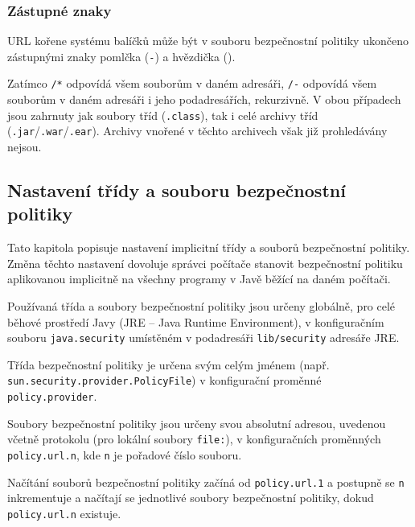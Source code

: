 \subsubsection{Zástupné znaky}

URL kořene systému balíčků může být v souboru bezpečnostní politiky ukončeno zástupnými znaky pomlčka ({\tt -}) a hvězdička ({\tt *}).

Zatímco {\tt /*} odpovídá všem souborům v daném adresáři, {\tt /-} odpovídá všem souborům v daném adresáři i jeho podadresářích, rekurzivně.
V obou případech jsou zahrnuty jak soubory tříd ({\tt .class}), tak i celé archivy tříd ({\tt .jar}/{\tt .war}/{\tt .ear}).
Archivy vnořené v těchto archivech však již prohledávány nejsou.
\cite{jdkdocPolicyFiles}

\subsection{Nastavení třídy a souboru bezpečnostní politiky} \label{nastaveniPolitiky}

Tato kapitola popisuje nastavení implicitní třídy a souborů bezpečnostní politiky. Změna těchto nastavení dovoluje správci počítače
stanovit bezpečnostní politiku aplikovanou implicitně na všechny programy v Javě běžící na daném počítači.

Používaná třída a soubory bezpečnostní politiky jsou určeny globálně, pro celé běhové prostředí Javy (JRE -- Java Runtime Environment),
v konfiguračním souboru {\tt java.security} umístěném v podadresáři {\tt lib/security} adresáře JRE. \cite{refPolicyFiles}

Třída bezpečnostní politiky je určena svým celým jménem (např. {\tt sun.security.provider{\linebreak}.PolicyFile}) v konfigurační proměnné {\tt policy.provider}. \cite{refPolicyFiles}

Soubory bezpečnostní politiky jsou určeny svou absolutní adresou, uvedenou včetně protokolu (pro lokální soubory {\tt file:}),
v konfiguračních proměnných {\tt policy.url.n}, kde {\tt n} je pořadové číslo souboru. \cite{refPolicyFiles}

Načítání souborů bezpečnostní politiky začíná od {\tt policy.url.1} a postupně se {\tt n} inkrementuje a načítají se jednotlivé soubory bezpečnostní politiky,
dokud {\tt policy.url.n} existuje. \cite{refPolicyFiles}

